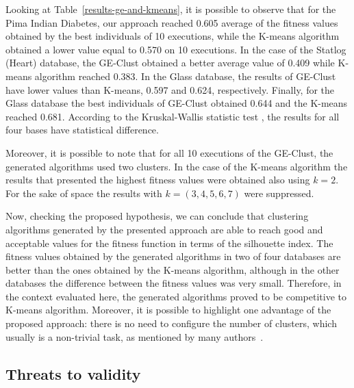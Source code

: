 \documentclass[conference]{IEEEtran}
\begin{document}
	
	
	Looking at Table~\ref{results-ge-and-kmeans}, it is possible to observe that for the Pima Indian Diabetes, our approach reached 0.605 average of the fitness values obtained by the best individuals of 10 executions, while the K-means algorithm obtained a lower value equal to 0.570 on 10 executions. In the case of the Statlog (Heart) database, the GE-Clust obtained a better average value of 0.409 while K-means algorithm reached 0.383. In the Glass database, the results of GE-Clust have lower values than K-means, 0.597 and 0.624, respectively. Finally, for the Glass database the best individuals of GE-Clust obtained 0.644 and the K-means reached 0.681. According to the Kruskal-Wallis statistic test \cite{mckight2010kruskal}, the results for all four bases have statistical difference.
	
	Moreover, it is possible to note that for all 10 executions of the GE-Clust, the generated algorithms used two clusters. In the case of the K-means algorithm the results that presented the highest fitness values were obtained also using $k=2$. For the sake of space the results with $k = (3,4,5,6,7)$ were suppressed.
	
	
	
	
	
	Now, checking the proposed hypothesis, we can conclude that clustering algorithms generated by the presented approach are able to reach good and acceptable values for the fitness function in terms of the silhouette index. The fitness values obtained by the generated algorithms in two of four databases are better than the ones obtained by the K-means algorithm, although in the other databases the difference between the fitness values was very small. Therefore, in the context evaluated here, the generated algorithms proved to be competitive to K-means algorithm. Moreover, it is possible to highlight one advantage of the proposed approach: there is no need to configure the number of clusters, which usually is a non-trivial task, as mentioned by many authors~\cite{tibshirani2001estimating}.
	
	
	\subsection{Threats to validity}
	
\end{document}
